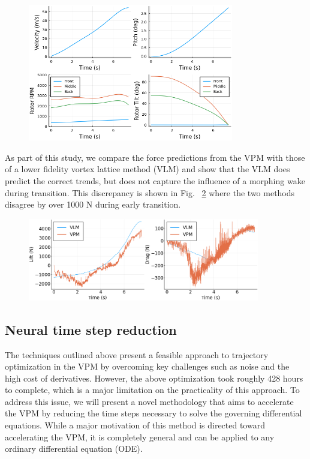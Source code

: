 \documentclass[12pt, letterpaper]{article}
\begin{document}
\begin{figure}[hbt!]
\centering
\includegraphics[width=0.8\textwidth]{figures/trajectory.png}
\caption{}
\label{fig:trajectory}
\end{figure}

As part of this study, we compare the force predictions from the VPM with those of a lower fidelity vortex lattice method (VLM) and show that the VLM does predict the correct trends, but does not capture the influence of a morphing wake during transition.  This discrepancy is shown in Fig. ~\ref{fig:comparison} where the two methods disagree by over 1000 N during early transition.

\begin{figure}[hbt!]
\centering
\includegraphics[width=0.9\textwidth]{figures/comparison.png}
\caption{}
\label{fig:comparison}
\end{figure}


\subsection{Neural time step reduction}

The techniques outlined above present a feasible approach to trajectory optimization in the VPM by overcoming key challenges such as noise and the high cost of derivatives.  However, the above optimization took roughly 428 hours to complete, which is a major limitation on the practicality of this approach. To address this issue, we will present a novel methodology that aims to accelerate the VPM by reducing the time steps necessary to solve the governing differential equations.  While a major motivation of this method is directed toward accelerating the VPM, it is completely general and can be applied to any ordinary differential equation (ODE).
\end{document}
